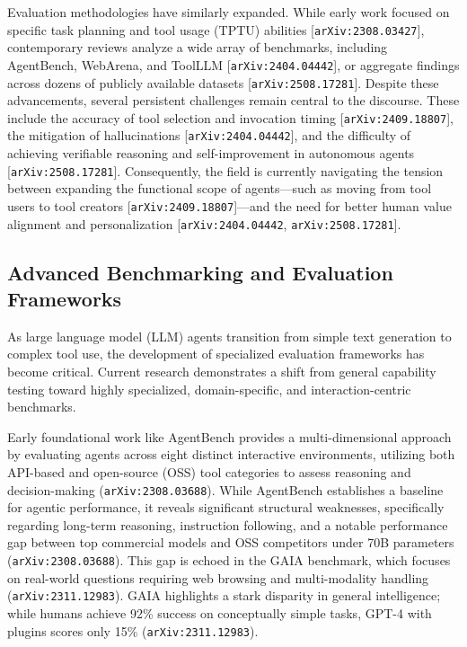 \documentclass[11pt]{article}
\begin{document}
Evaluation methodologies have similarly expanded. While early work focused on specific task planning and tool usage (TPTU) abilities [\texttt{arXiv:2308.03427}], contemporary reviews analyze a wide array of benchmarks, including AgentBench, WebArena, and ToolLLM [\texttt{arXiv:2404.04442}], or aggregate findings across dozens of publicly available datasets [\texttt{arXiv:2508.17281}]. Despite these advancements, several persistent challenges remain central to the discourse. These include the accuracy of tool selection and invocation timing [\texttt{arXiv:2409.18807}], the mitigation of hallucinations [\texttt{arXiv:2404.04442}], and the difficulty of achieving verifiable reasoning and self-improvement in autonomous agents [\texttt{arXiv:2508.17281}]. Consequently, the field is currently navigating the tension between expanding the functional scope of agents—such as moving from tool users to tool creators [\texttt{arXiv:2409.18807}]—and the need for better human value alignment and personalization [\texttt{arXiv:2404.04442}, \texttt{arXiv:2508.17281}].

\subsection{Advanced Benchmarking and Evaluation Frameworks}

As large language model (LLM) agents transition from simple text generation to complex tool use, the development of specialized evaluation frameworks has become critical. Current research demonstrates a shift from general capability testing toward highly specialized, domain-specific, and interaction-centric benchmarks.

Early foundational work like AgentBench provides a multi-dimensional approach by evaluating agents across eight distinct interactive environments, utilizing both API-based and open-source (OSS) tool categories to assess reasoning and decision-making (\texttt{arXiv:2308.03688}). While AgentBench establishes a baseline for agentic performance, it reveals significant structural weaknesses, specifically regarding long-term reasoning, instruction following, and a notable performance gap between top commercial models and OSS competitors under 70B parameters (\texttt{arXiv:2308.03688}). This gap is echoed in the GAIA benchmark, which focuses on real-world questions requiring web browsing and multi-modality handling (\texttt{arXiv:2311.12983}). GAIA highlights a stark disparity in general intelligence; while humans achieve 92\% success on conceptually simple tasks, GPT-4 with plugins scores only 15\% (\texttt{arXiv:2311.12983}).
\end{document}
